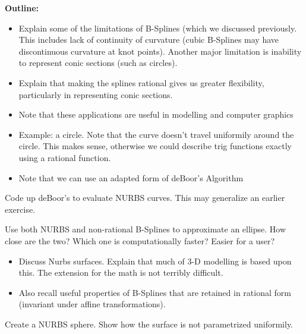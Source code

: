 

{\bf Outline:}

\begin{itemize}
\item Explain some of the limitations of B-Splines (which we discussed previously. This includes lack of continuity of curvature (cubic B-Splines may have discontinuous curvature at knot points). Another major limitation is inability to represent conic sections (such as circles).
\item Explain that making the splines rational gives us greater flexibility, particularly in representing conic sections.
\item Note that these applications are useful in modelling and computer graphics
\item Example: a circle. Note that the curve doesn't travel uniformily around the circle. This makes sense, otherwise we could describe trig functions exactly using a rational function.
\item Note that we can use an adapted form of deBoor's Algorithm
\end{itemize}

\begin{problem}
Code up deBoor's to evaluate NURBS curves. This may generalize an earlier exercise.
\end{problem}

\begin{problem}
Use both NURBS and non-rational B-Splines to approximate an ellipse. How close are the two? Which one is computationally faster? Easier for a user?
\end{problem}

\begin{itemize}
\item Discuss Nurbs surfaces. Explain that much of 3-D modelling is based upon this. The extension for the math is not terribly difficult.
\item Also recall useful properties of B-Splines that are retained in rational form (invariant under affine transformations).
\end{itemize}

\begin{problem}
Create a NURBS sphere. Show how the surface is not parametrized uniformily.
\end{problem}
